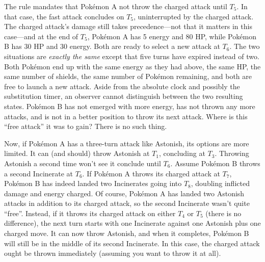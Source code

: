The rule mandates that Pokémon A not throw the charged attack until $T_5$.
In that case, the fast attack concludes on $T_5$, uninterrupted by the charged attack.
The charged attack's damage still takes precedence---not that it matters in this case---and at the
  end of $T_5$, Pokémon A has 5 energy and 80 HP, while Pokémon B has 30 HP and 30 energy.
Both are ready to select a new attack at $T_6$.
The two situations are \textit{exactly the same} except that five turns have expired instead of two.
Both Pokémon end up with the same energy as they had above, the same HP, the same number of shields,
  the same number of Pokémon remaining, and both are free to launch a new attack.
Aside from the absolute clock and possibly the substitution timer, an observer cannot distinguish
  between the two resulting states.
Pokémon B has not emerged with more energy, has not thrown any more attacks, and is not in a better
  position to throw its next attack.
Where is this ``free attack'' it was to gain?
There is no such thing.

Now, if Pokémon A has a three-turn attack like Astonish, its options are more limited.
It can (and should) throw Astonish at $T_1$, concluding at $T_3$.
Throwing Astonish a second time won't see it conclude until $T_6$.
Assume Pokémon B throws a second Incinerate at $T_6$.
If Pokémon A throws its charged attack at $T_7$, Pokémon B has indeed landed two Incinerates going into $T_8$,
  doubling inflicted damage and energy charged.
Of course, Pokémon A has landed two Astonish attacks in addition to its charged attack, so the
  second Incinerate wasn't quite ``free''.
Instead, if it throws its charged attack on either $T_4$ or $T_5$ (there is no difference),
 the next turn starts with one Incinerate against one Astonish plus one charged move.
It can now throw Astonish, and when it completes, Pokémon B will still be in the middle of its second Incinerate.
In this case, the charged attack ought be thrown immediately (assuming you want to throw it at all).
